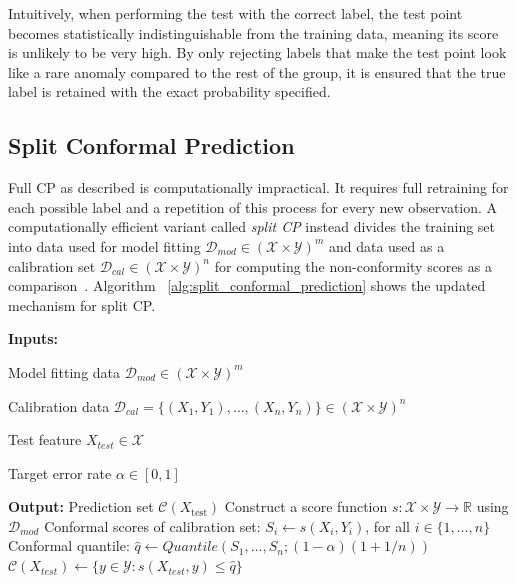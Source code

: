 Intuitively, when performing the test with the correct label, the test point becomes statistically indistinguishable from the training data, meaning its score is unlikely to be very high. By only rejecting labels that make the test point look like a rare anomaly compared to the rest of the group, it is ensured that the true label is retained with the exact probability specified.

\subsection{Split Conformal Prediction}
\label{sect:split_conformal_prediction}
Full \gls{CP} as described is computationally impractical. It requires full retraining for each possible label and a repetition of this process for every new observation. A computationally efficient variant called \textit{split \gls{CP}} instead divides the training set into data used for model fitting  $\mathcal{D}_{mod} \in (\mathcal{X} \times \mathcal{Y})^m$ and data used as a calibration set $\mathcal{D}_{cal} \in (\mathcal{X} \times \mathcal{Y})^n$ for computing the non-conformity scores as a comparison~\cite{Vovk-AlgorithmicLearning-2022}. Algorithm ~\ref{alg:split_conformal_prediction} shows the updated mechanism for split \gls{CP}.

\begin{algorithm}[t]
    \begin{algorithmic}[1]
        \vspace{1mm}
        \Statex \textbf{Inputs:}
        \Statex \hspace{\algorithmicindent}
        \begin{minipage}[t]{0.92\linewidth}
            Model fitting data
            $\mathcal{D}_{mod} \in (\mathcal{X} \times \mathcal{Y})^m$
            
            Calibration data
            $\mathcal{D}_{cal} = \{(X_1, Y_1), \dots, (X_n, Y_n)\}\in (\mathcal{X} \times \mathcal{Y})^n$
            
            Test feature
            $X_{test} \in \mathcal{X}$
            
            Target error rate
            $\alpha \in [0, 1]$
        \end{minipage}
        \vspace{1mm}
        \Statex \textbf{Output:}
        \Statex \hspace{\algorithmicindent}
        Prediction set $\mathcal C(X_{\mathrm{test}})$
        \Statex \hrulefill
        \State Construct a score function $s: \mathcal{X} \times \mathcal{Y} \rightarrow \mathbb{R}$ using $\mathcal{D}_{mod}$
        \State Conformal scores of calibration set: $S_i \leftarrow s(X_i, Y_i)$, for all $i \in \{1, \dots, n\}$
        \State Conformal quantile: $\hat{q} \leftarrow Quantile(S_1, \dots, S_n; (1 - \alpha)(1 + 1/n))$
        \State \Return $\mathcal{C}(X_{test}) \leftarrow \{y \in \mathcal{Y}: s(X_{test}, y) \le \hat{q}\}$
    \end{algorithmic}
    \caption{Split Conformal Prediction for Classification}
    \label{alg:split_conformal_prediction}
\end{algorithm}

